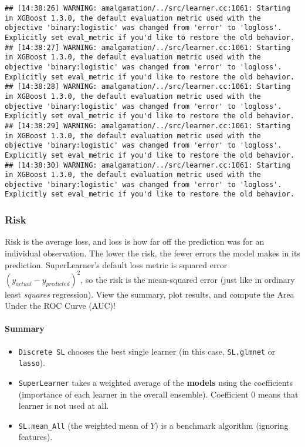 \documentclass[
]{book}
\providecommand{\tightlist}{%
  \setlength{\itemsep}{0pt}\setlength{\parskip}{0pt}}
\begin{document}
\begin{verbatim}
## [14:38:26] WARNING: amalgamation/../src/learner.cc:1061: Starting in XGBoost 1.3.0, the default evaluation metric used with the objective 'binary:logistic' was changed from 'error' to 'logloss'. Explicitly set eval_metric if you'd like to restore the old behavior.
## [14:38:27] WARNING: amalgamation/../src/learner.cc:1061: Starting in XGBoost 1.3.0, the default evaluation metric used with the objective 'binary:logistic' was changed from 'error' to 'logloss'. Explicitly set eval_metric if you'd like to restore the old behavior.
## [14:38:28] WARNING: amalgamation/../src/learner.cc:1061: Starting in XGBoost 1.3.0, the default evaluation metric used with the objective 'binary:logistic' was changed from 'error' to 'logloss'. Explicitly set eval_metric if you'd like to restore the old behavior.
## [14:38:29] WARNING: amalgamation/../src/learner.cc:1061: Starting in XGBoost 1.3.0, the default evaluation metric used with the objective 'binary:logistic' was changed from 'error' to 'logloss'. Explicitly set eval_metric if you'd like to restore the old behavior.
## [14:38:30] WARNING: amalgamation/../src/learner.cc:1061: Starting in XGBoost 1.3.0, the default evaluation metric used with the objective 'binary:logistic' was changed from 'error' to 'logloss'. Explicitly set eval_metric if you'd like to restore the old behavior.
\end{verbatim}

\hypertarget{risk}{%
\subsubsection{Risk}\label{risk}}

Risk is the average loss, and loss is how far off the prediction was for an individual observation. The lower the risk, the fewer errors the model makes in its prediction. SuperLearner's default loss metric is squared error \((y_{actual} - y_{predicted})^2\), so the risk is the mean-squared error (just like in ordinary least \emph{squares} regression). View the summary, plot results, and compute the Area Under the ROC Curve (AUC)!

\hypertarget{summary}{%
\paragraph{Summary}\label{summary}}

\begin{itemize}
\tightlist
\item
  \texttt{Discrete\ SL} chooses the best single learner (in this case, \texttt{SL.glmnet} or \texttt{lasso}).
\item
  \texttt{SuperLearner} takes a weighted average of the \textbf{models} using the coefficients (importance of each learner in the overall ensemble). Coefficient 0 means that learner is not used at all.
\item
  \texttt{SL.mean\_All} (the weighted mean of \(Y\)) is a benchmark algorithm (ignoring features).
\end{itemize}
\end{document}
